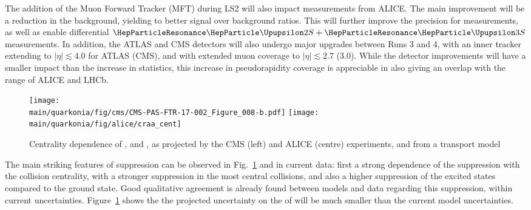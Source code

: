 \documentclass[../report.tex]{subfiles}
\providecommand{\main}{..}
\begin{document}
The addition of the Muon Forward Tracker (MFT) during LS2 will also impact \PGU measurements from ALICE. The main improvement will be a reduction in the background, yielding to better signal over background
ratios. This will further improve the precision for  measurements, as well as enable differential $\PGUP{2S}+\PGUP{3S}$ measurements.
In addition, the ATLAS and CMS detectors will also undergo major upgrades between Runs 3 and 4, with an inner tracker
extending to $|\eta|\lesssim 4.0$ for ATLAS (CMS), and with extended muon coverage to $|\eta|\lesssim 2.7$ (3.0). While the detector improvements will have a smaller impact than the
increase in statistics, this increase in pseudorapidity coverage is appreciable in also giving an overlap with the range of ALICE and LHCb.


\begin{figure}
\begin{center}
 \texttt{[image: \\main/quarkonia/fig/cms/CMS-PAS-FTR-17-002\_Figure\_008-b.pdf]}
 \texttt{[image: \\main/quarkonia/fig/alice/craa\_cent]}
\end{center}

 \caption{Centrality dependence of ,  and  \raa, as projected by the CMS\cite{CMS-PAS-FTR-17-002,Krouppa:2016jcl} (left) and ALICE (centre) experiments, and from a transport model\cite{Du:2017qkv}}
 \label{fig:upsi_raa_npart}
\end{figure}

% 


The main striking features of \PGU suppression can be observed in Fig.~\ref{fig:upsi_raa_npart} and in current data: first a strong dependence of the suppression with the collision
centrality, with a stronger suppression in the most central collisions, and also a higher suppression of the excited states compared to the ground state. Good qualitative agreement
is already found between models and data regarding this suppression, within current uncertainties. Figure~\ref{fig:upsi_raa_npart} shows the the projected uncertainty on the \raa of  will be much smaller than the current model uncertainties.
\end{document}
